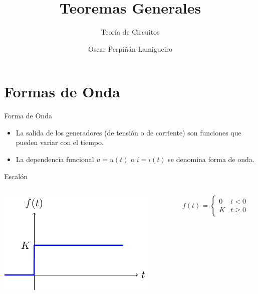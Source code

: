 \documentclass[aspectratio=169, usenames,svgnames,dvipsnames]{beamer}
\author{Oscar Perpiñán Lamigueiro}
\date{}
\title{Teoremas Generales}
\subtitle{Teoría de Circuitos}
\begin{document}
\maketitle

\section{Formas de Onda}
\label{sec:org1b8f330}
\begin{frame}[label={sec:org0d72677}]{Forma de Onda}
\begin{itemize}
\item La salida de los generadores (de tensión o de corriente) son funciones que pueden variar con el tiempo.
\item La dependencia funcional \(u = u(t)\) o \(i = i(t)\) se denomina forma de onda.
\end{itemize}
\end{frame}

\begin{frame}[label={sec:org56dad20}]{Escalón}
\begin{columns}
\begin{column}{0.5\columnwidth}
\begin{center}
\includegraphics[width=.9\linewidth]{../figs/escalon.pdf}
\end{center}
\end{column}

\begin{column}{0.5\columnwidth}
\[
  f(t) = %
  \begin{cases}
    0 & t < 0\\
    K & t \geq 0
  \end{cases}
  \]
\end{column}
\end{columns}
\end{frame}
\end{document}
